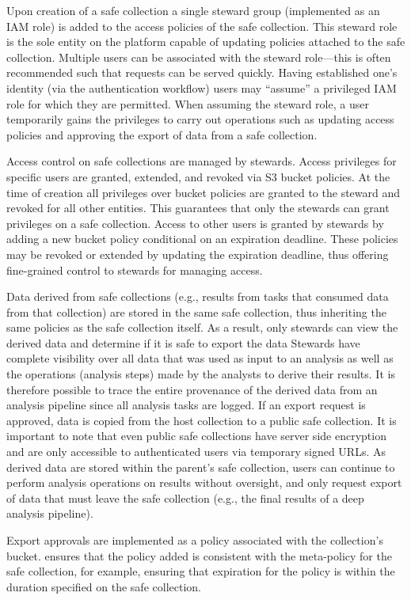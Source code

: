 Upon creation of a safe collection a single steward group (implemented as an IAM role) is added to the
access policies of the safe collection. This steward role is the sole entity on the platform capable of
updating policies attached to the safe collection.
Multiple users can be associated with the steward role---this is often recommended such
that requests can be served quickly.
Having established one's identity (via the \NAME authentication workflow) users
may ``assume'' a privileged IAM role for which they are permitted.
When assuming the steward role, a user temporarily gains the privileges to carry out operations such
as updating access policies and approving the export of data from a safe collection.

Access control on safe collections are managed by stewards. Access privileges for specific users
are granted, extended, and revoked via S3 bucket policies. At the time of creation all
privileges over bucket policies are granted to the steward and revoked for all other entities. This
guarantees that only the stewards can grant privileges on a safe collection. Access to other users
is granted by stewards by adding a new bucket policy conditional on an expiration deadline. These policies may be revoked or
extended by updating the expiration deadline, thus offering fine-grained control to stewards for managing
access.

Data derived from safe collections (e.g., results from tasks that consumed data from that collection)
are stored in the same safe collection, thus inheriting the same policies as the safe collection itself.
As a result, only stewards can view the derived data and determine if it is safe to
export the data
Stewards have complete visibility over all data that was used as input to an analysis as
well as the operations (analysis steps) made by the analysts to derive their results.
It is therefore possible to trace the entire provenance of the derived data from an
analysis pipeline since all analysis tasks are logged.
If an export request is approved, data is copied from the host collection to a public safe collection.
It is important to note that even public safe collections have server side encryption and
are only accessible to authenticated users via temporary signed URLs.
As derived data are stored within the parent's safe collection, users can continue
to perform analysis operations on results without oversight,
and only request export of data that must leave the safe collection (e.g., the
final results of a deep analysis pipeline).

Export approvals are implemented as a policy associated with the collection's bucket.
\NAME ensures that the policy added is consistent with the meta-policy for the safe collection,
for example, ensuring that expiration for the policy
is within the duration specified on the safe collection.


